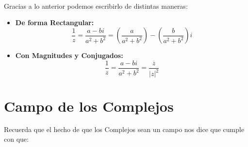 \documentclass[12pt, fleqn]{report}                             %
\newcommand \Over               {\overline}                     %
\theoremstyle{break}                                            %
\newcommand{\Wrap}[1]           {\left( #1 \right)}             %
\newcommand{\pfrac}[2]      {\Wrap{\dfrac{#1}{#2}}}             %
\begin{document}
            Gracias a lo anterior podemos escribirlo de distintas maneras:

            \begin{itemize}

                \item
                    \textbf{De forma Rectangular:}
                    \begin{equation}
                         \dfrac{1}{z} = \dfrac{a-bi}{a^2+b^2} = \pfrac{a}{a^2+b^2} - \pfrac{b}{a^2+b^2}i 
                    \end{equation}


                \item
                    \textbf{Con Magnitudes y Conjugados:}
                    \begin{equation}
                        \dfrac{1}{z} = \dfrac{a-bi}{a^2+b^2} = \dfrac{\Over{z}}{|z|^2}
                    \end{equation}


            \end{itemize}




        \clearpage
        \section{Campo de los Complejos}

            Recuerda que el hecho de que los Complejos sean un campo nos dice que cumple con que:
\end{document}
